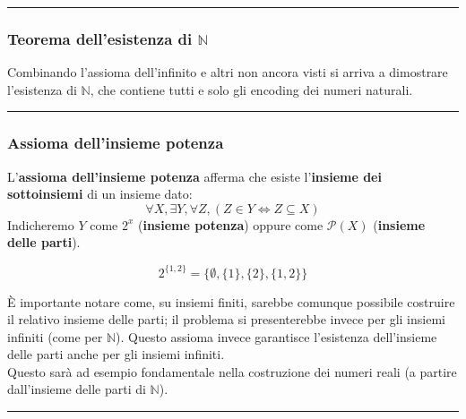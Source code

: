 \documentclass[
  a4paper,
]{article}
\begin{document}
\par\noindent\rule{\linewidth}{0.4pt}\par\vspace{6pt}

\hypertarget{teorema-dellesistenza-di-mathbbn}{%
\subsubsection{\texorpdfstring{Teorema dell'esistenza di
\(\mathbb{N}\)}{Teorema dell'esistenza di \textbackslash mathbb\{N\}}}\label{teorema-dellesistenza-di-mathbbn}}

Combinando l'assioma dell'infinito e altri non ancora visti si arriva a
dimostrare l'esistenza di \(\mathbb{N}\), che contiene tutti e solo gli
encoding dei numeri naturali.

\par\noindent\rule{\linewidth}{0.4pt}\par\vspace{6pt}

\hypertarget{assioma-dellinsieme-potenza}{%
\subsubsection{Assioma dell'insieme
potenza}\label{assioma-dellinsieme-potenza}}

L'\textbf{assioma dell'insieme potenza} afferma che esiste
l'\textbf{insieme dei sottoinsiemi} di un insieme dato: \[
\forall X, \exists Y, \forall Z, (Z \in Y \iff Z \subseteq X)
\] Indicheremo \(Y\) come \(2^x\) (\textbf{insieme potenza}) oppure come
\(\mathcal{P}(X)\) (\textbf{insieme delle parti}).

\begin{examplebox}[Esempio]

\[
2^{\{1, 2\}} = \{\emptyset , \{1\}, \{2\}, \{1, 2\}\}
\]

\end{examplebox}

È importante notare come, su insiemi finiti, sarebbe comunque possibile
costruire il relativo insieme delle parti; il problema si presenterebbe
invece per gli insiemi infiniti (come per \(\mathbb{N}\)). Questo
assioma invece garantisce l'esistenza dell'insieme delle parti anche per
gli insiemi infiniti.\\
Questo sarà ad esempio fondamentale nella costruzione dei numeri reali
(a partire dall'insieme delle parti di \(\mathbb{N}\)).

\par\noindent\rule{\linewidth}{0.4pt}\par\vspace{6pt}
\end{document}
